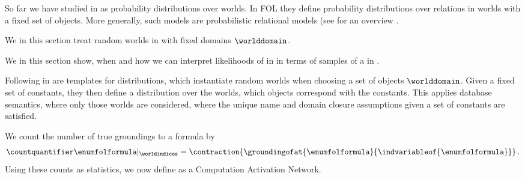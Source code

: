 
So far we have studied \MarkovLogicNetworks{} in \propositionalLogic{} as probability distributions over worlds.
In FOL they define probability distributions over relations in worlds with a fixed set of objects.
More generally, such models are probabilistic relational models (see for an overview \cite{getoor_introduction_2019}.


We in this section treat random worlds in \firstOrderLogic{} with fixed domains $\worlddomain$.

%
We in this section show, when and how we can interpret likelihoods of \MarkovLogicNetworks{} in \firstOrderLogic{} in terms of samples of a \MarkovLogicNetwork{} in \propositionalLogic{}.

\subsect{\HybridFOLNetworks{}}

Following \cite{richardson_markov_2006} \MarkovLogicNetworks{} in \firstOrderLogic{} are templates for distributions, which instantiate random worlds when choosing a set of objects $\worlddomain$.
Given a fixed set of constants, they then define a distribution over the worlds, which objects correspond with the constants. %
This applies database semantics, where only those worlds are considered, where the unique name and domain closure assumptions given a set of constants are satisfied.

We count the number of true groundings to a formula by
\begin{align*}
    \countquantifier\enumfolformula|_{\worldindices}
    = \contraction{\groundingofat{\enumfolformula}{\indvariableof{\enumfolformula}}} \, .
\end{align*}
Using these counts as statistics, we now define \HybridFOLNetworks{} as a Computation Activation Network.

